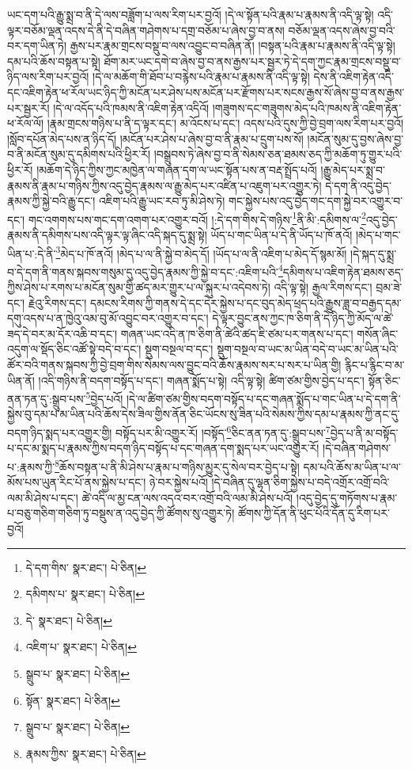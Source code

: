 ཡང་དག་པའི་རྒྱུ་སྨྲ་བ་ནི་དེ་ལས་བཟློག་པ་ལས་རིག་པར་བྱའོ། །དེ་ལ་སྟོན་པའི་རྣམ་པ་རྣམས་ནི་འདི་ལྟ་སྟེ། འདི་ལྟར་བཅོམ་ལྡན་འདས་དེ་ནི་དེ་བཞིན་གཤེགས་པ་དགྲ་བཅོམ་པ་ཞེས་བྱ་བ་ནས། བཅོམ་ལྡན་འདས་ཞེས་བྱ་བའི་བར་དག་ཡིན་ཏེ། རྒྱས་པར་རྣམ་གྲངས་བསྡུ་བ་ལས་འབྱུང་བ་བཞིན་ནོ། །བསྟན་པའི་རྣམ་པ་རྣམས་ནི་འདི་ལྟ་སྟེ། དམ་པའི་ཆོས་བསྟན་པ་སྟེ། ཐོག་མར་ཡང་དགེ་བ་ཞེས་བྱ་བ་ནས་རྒྱས་པར་སྦྱར་ཏེ་དེ་དག་ཀྱང་རྣམ་གྲངས་བསྡུ་བ་ཉིད་ལས་རིག་པར་བྱའོ། །དེ་ལ་མཆོག་གི་ཐོབ་པ་བརྙེས་པའི་རྣམ་པ་རྣམས་ནི་འདི་ལྟ་སྟེ། དེས་ནི་འཇིག་རྟེན་འདི་དང་འཇིག་རྟེན་ཕ་རོལ་ཡང་ཉིད་ཀྱི་མངོན་པར་ཤེས་པས་མངོན་པར་རྫོགས་པར་སངས་རྒྱས་སོ་ཞེས་བྱ་བ་ནས་རྒྱས་པར་སྦྱར་རོ། །དེ་ལ་འདོད་པའི་ཁམས་ནི་འཇིག་རྟེན་འདིའོ། །གཟུགས་དང་གཟུགས་མེད་པའི་ཁམས་ནི་འཇིག་རྟེན་ཕ་རོལ་ལོ། །རྣམ་གྲངས་གཉིས་པ་ནི་ད་ལྟར་དང་། མ་འོངས་པ་དང་། འདས་པའི་དུས་ཀྱི་བྱེ་བྲག་ལས་རིག་པར་བྱའོ། །སློབ་དཔོན་མེད་པས་ན་ཉིད་དོ། །མངོན་པར་ཤེས་པ་ཞེས་བྱ་བ་ནི་རྣམ་པ་དྲུག་པས་སོ། །མངོན་སུམ་དུ་བྱས་ཞེས་བྱ་བ་ནི་མངོན་སུམ་དུ་དམིགས་པའི་ཕྱིར་རོ། །བསྒྲུབས་ཏེ་ཞེས་བྱ་བ་ནི་སེམས་ཅན་ཐམས་ཅད་ཀྱི་མཆོག་ཏུ་གྱུར་པའི་ཕྱིར་རོ། །མཆོག་དེ་ཉིད་ཀྱིས་ཀྱང་མཁྱེན་ལ་གཞན་དག་ལ་ཡང་སྟོན་པས་ན་བརྡ་སྤྲོད་པའོ། །རྒྱུ་མེད་པར་སྨྲ་བ་རྣམས་ནི་རྣམ་པ་གཉིས་ཀྱིས་འདུ་བྱེད་རྣམས་ལ་རྒྱུ་མེད་པར་འཛིན་པ་འཇུག་པར་འགྱུར་ཏེ། དེ་དག་ནི་འདུ་བྱེད་རྣམས་ཀྱི་སྐྱེ་བའི་རྒྱུ་དང་། འཇིག་པའི་རྒྱུ་ཡང་རབ་ཏུ་མི་ཤེས་ཏེ། གང་སྐྱེས་པས་འདུ་བྱེད་གང་དག་སྐྱེ་བར་འགྱུར་བ་དང་། གང་འགགས་པས་གང་དག་འགག་པར་འགྱུར་བའོ། །:དེ་དག་གིས་དེ་གཉིས་\footnote{དེ་དག་གིས་  སྣར་ཐང་།  པེ་ཅིན། }ནི་མི་:དམིགས་ལ་\footnote{དམིགས་པ་  སྣར་ཐང་།  པེ་ཅིན། }འདུ་བྱེད་རྣམས་ནི་དམིགས་པས་འདི་ལྟར་ལྟ་ཞིང་འདི་སྐད་དུ་སྨྲ་སྟེ། ཡོད་པ་གང་ཡིན་པ་དེ་ནི་ཡོད་པ་ཁོ་ནའོ། །མེད་པ་གང་ཡིན་པ་:དེ་ནི་\footnote{དེ་  སྣར་ཐང་།  པེ་ཅིན། }མེད་པ་ཁོ་ནའོ། །མེད་པ་ལ་ནི་སྐྱེ་བ་མེད་དོ། །ཡོད་པ་ལ་ནི་འཇིག་པ་མེད་དོ་སྙམ་མོ། །དེ་སྐད་དུ་སྨྲ་བ་དེ་དག་ནི་གནས་སྐབས་གསུམ་དུ་འདུ་བྱེད་རྣམས་ཀྱི་སྐྱེ་བ་དང་:འཇིག་པའི་\footnote{འཇིག་པ་  སྣར་ཐང་།  པེ་ཅིན། }དམིགས་པ་འཇིག་རྟེན་ཐམས་ཅད་ཀྱིས་ཤེས་པ་རགས་པ་མངོན་སུམ་གྱི་ཚད་མར་གྱུར་པ་ལ་སྐུར་པ་འདེབས་ཏེ། འདི་ལྟ་སྟེ། རྒྱལ་རིགས་དང་། བྲམ་ཟེ་དང་། རྗེའུ་རིགས་དང་། དམངས་རིགས་ཀྱི་གནས་དེ་དང་དེར་སྐྱེས་པ་དང་བུད་མེད་ཕྲད་པའི་རྒྱུས་ཟླ་བ་བརྒྱད་དམ་དགུ་འདས་པ་ན་ཁྱེའུ་འམ་བུ་མོ་འབྱུང་བར་འགྱུར་བ་དང་། དེ་ལྟར་བྱུང་ནས་ཀྱང་ཁ་ཅིག་ནི་དེ་ཉིད་ཀྱི་མོད་ལ་ཚེ་ཟད་དེ་བར་མ་དོར་འཆི་བ་དང་། གཞན་ཡང་འདི་ན་ཁ་ཅིག་ནི་ཚེའི་ཚད་ཇི་ཙམ་པར་གནས་པ་དང་། གསོན་ཞིང་འདུག་ལ་སྡོད་ཅིང་འཚོ་སྟེ་བདེ་བ་དང་། སྡུག་བསྔལ་བ་དང་། སྡུག་བསྔལ་བ་ཡང་མ་ཡིན་བདེ་བ་ཡང་མ་ཡིན་པའི་ཚོར་བའི་གནས་སྐབས་ཀྱི་བྱེ་བྲག་གིས་སེམས་ལས་བྱུང་བའི་ཆོས་རྣམས་སར་པ་སར་པ་ཡིན་གྱི། རྙིང་པ་རྙིང་བ་མ་ཡིན་ནོ། །འདི་གཉིས་ནི་བདག་བསྟོད་པ་དང་། གཞན་སྨོད་པ་སྟེ། འདི་ལྟ་སྟེ། ཚིག་ཙམ་གྱིས་བྱེད་པ་དང་། སྟོན་ཅིང་ནན་ཏན་དུ་:སྒྲུབ་པས་\footnote{སྒྲུབ་པ་  སྣར་ཐང་།  པེ་ཅིན། }བྱེད་པའོ། །དེ་ལ་ཚིག་ཙམ་གྱིས་བདག་བསྟོད་པ་དང་གཞན་སྨོད་པ་གང་ཡིན་པ་དེ་དག་ནི་སྐྱེས་བུ་དམ་པ་མ་ཡིན་པའི་ཆོས་དེས་ཟིལ་གྱིས་ནོན་ཅིང་ཡོངས་སུ་ཟིན་པའི་སེམས་ཀྱིས་དམ་པ་རྣམས་ཀྱི་ནང་དུ་བདག་ཉིད་སྨད་པར་འགྱུར་གྱི། བསྟོད་པར་མི་འགྱུར་རོ། །བསྟོད་\footnote{སྟོན་  སྣར་ཐང་།  པེ་ཅིན། }ཅིང་ནན་ཏན་དུ་:སྒྲུབ་པས་\footnote{སྒྲུབ་པ་  སྣར་ཐང་།  པེ་ཅིན། }བྱེད་པ་ནི་མ་བསྟོད་པ་དང་མ་སྨད་པ་རྣམས་ཀྱིས་བདག་ཉིད་བསྟོད་པ་དང་གཞན་དག་སྨད་པར་ཡང་འགྱུར་རོ། །དེ་བཞིན་གཤེགས་པ་:རྣམས་ཀྱི་\footnote{རྣམས་ཀྱིས་  སྣར་ཐང་།  པེ་ཅིན། }ཆོས་བསྟན་པ་ནི་མི་ཤེས་པ་རྣམ་པ་གཉིས་མྱུར་དུ་སེལ་བར་བྱེད་པ་སྟེ། དམ་པའི་ཆོས་མ་ཡིན་པ་ལ་མོས་པས་ཡུན་རིང་པོ་ནས་སྐྱེས་པ་དང་། ཉེ་བར་སྐྱེས་པའོ། །དེ་བཞིན་དུ་ལྷན་ཅིག་སྐྱེས་པ་བདེ་འགྲོར་འགྲོ་བའི་ལམ་མི་ཤེས་པ་དང་། ཚེ་འདི་ལ་མྱ་ངན་ལས་འདའ་བར་འགྲོ་བའི་ལམ་མི་ཤེས་པའོ། །འདུ་བྱེད་དུ་གཏོགས་པ་རྣམ་པ་བཅུ་གཅིག་གཅིག་ཏུ་བསྡུས་ན་འདུ་བྱེད་ཀྱི་ཚོགས་སུ་འགྱུར་ཏེ། ཚོགས་ཀྱི་དོན་ནི་ཕུང་པོའི་དོན་དུ་རིག་པར་བྱའོ། 